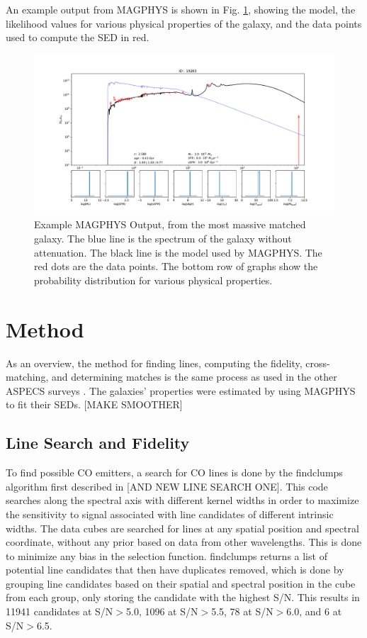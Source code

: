 An example output from MAGPHYS is shown in Fig. \ref{fig:MAGPHYS_Example}, showing the model, the likelihood values for various physical properties of the galaxy, and the data points used to compute the SED in red.

\begin{figure}[tbp]
\centering \includegraphics[width=120mm]{19265.pdf}
\caption{Example MAGPHYS Output, from the most massive matched galaxy. The blue line is the spectrum of the galaxy without attenuation. The black line is the model used by MAGPHYS. The red dots are the data points. The bottom row of graphs show the probability distribution for various physical properties.}
\label{fig:MAGPHYS_Example}
\end{figure}

\section{Method}

As an overview, the method for finding lines, computing the fidelity, cross-matching, and determining matches is the same process as used in the other ASPECS surveys \cite{walter2016alma, decarli2019alma}. The galaxies' properties were estimated by using MAGPHYS to fit their SEDs. [MAKE SMOOTHER]

\subsection{Line Search and Fidelity}

To find possible CO emitters, a search for CO lines is done by the findclumps algorithm first described in \cite{walter2016alma} [AND NEW LINE SEARCH ONE]. This code searches along the spectral axis with different kernel widths in order to maximize the sensitivity to signal associated with line candidates of different intrinsic widths. The data cubes are searched for lines at any spatial position and spectral coordinate, without any prior based on data from other wavelengths. This is done to minimize any bias in the selection function. findclumps returns a list of potential line candidates that then have duplicates removed, which is done by grouping line candidates based on their spatial and spectral position in the cube from each group, only storing the candidate with the highest S/N. This results in 11941 candidates at S/N$>$5.0, 1096 at S/N$>$5.5, 78 at S/N$>$6.0, and 6 at S/N$>$6.5. 

